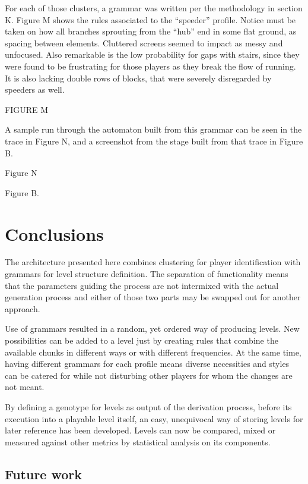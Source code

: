 \documentclass[conference]{IEEEtran}
\begin{document}
For each of those clusters, a grammar was written per the methodology in section K. Figure M shows the rules associated to the ``speeder'' profile. Notice must be taken on how all branches sprouting from the ``hub'' end in some flat ground, as spacing between elements. Cluttered screens seemed to impact as messy and unfocused. Also remarkable is the low probability for gaps with stairs, since they were found to be frustrating for those players as they break the flow of running. It is also lacking double rows of blocks, that were severely disregarded by speeders as well.

FIGURE M

A sample run through the automaton built from this grammar can be seen in the trace in Figure N, and a screenshot from the stage built from that trace in Figure B.

Figure N

Figure B.

\section{Conclusions}

The architecture presented here combines clustering for player identification with grammars for level structure definition. The separation of functionality means that the parameters guiding the process are not intermixed with the actual generation process and either of those two parts may be swapped out for another approach.

Use of grammars resulted in a random, yet ordered way of producing levels. New possibilities can be added to a level just by creating rules that combine the available chunks in different ways or with different frequencies. At the same time, having different grammars for each profile means diverse necessities and styles can be catered for while not disturbing other players for whom the changes are not meant.

By defining a genotype for levels as output of the derivation process, before its execution into a playable level itself, an easy, unequivocal way of storing levels for later reference has been developed. Levels can now be compared, mixed or measured against other metrics by statistical analysis on its components.  

\subsection*{Future work}
\end{document}
